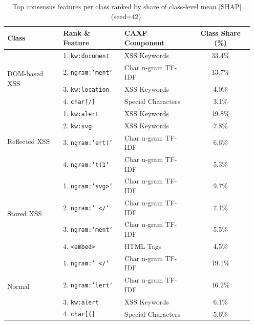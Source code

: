 \documentclass[11pt,a4paper]{article}
\begin{document}
\begin{table}[ht]
\centering
\caption{Top consensus features per class ranked by share of class-level mean $|$SHAP$|$ (seed=42).}
\label{tab:shap_top_class}
\setlength{\tabcolsep}{5pt}
\begin{tabular}{lllc}
\toprule
\textbf{Class} & \textbf{Rank \& Feature} & \textbf{CAXF Component} & \textbf{Class Share (\%)} \\
\midrule
\multirow{4}{*}{DOM-based XSS}
  & 1. \texttt{kw:document}     & XSS Keywords        & 33.4\% \\
  & 2. \texttt{ngram:'ment'}     & Char n-gram TF-IDF  & 13.7\% \\
  & 3. \texttt{kw:location}     & XSS Keywords        &  4.0\% \\
  & 4. \texttt{char[/]}         & Special Characters  &  3.1\% \\
\midrule
\multirow{4}{*}{Reflected XSS}
  & 1. \texttt{kw:alert}        & XSS Keywords        & 19.8\% \\
  & 2. \texttt{kw:svg}          & XSS Keywords        &  7.8\% \\
  & 3. \texttt{ngram:'ert('}    & Char n-gram TF-IDF  &  6.6\% \\
  & 4. \texttt{ngram:'t(1'}     & Char n-gram TF-IDF  &  5.3\% \\
\midrule
\multirow{4}{*}{Stored XSS}
  & 1. \texttt{ngram:'svg>'}    & Char n-gram TF-IDF  &  9.7\% \\
  & 2. \texttt{ngram:' </'}     & Char n-gram TF-IDF  &  7.1\% \\
  & 3. \texttt{ngram:'ment'}    & Char n-gram TF-IDF  &  5.5\% \\
  & 4. \texttt{<embed>}         & HTML Tags           &  4.5\% \\
\midrule
\multirow{4}{*}{Normal}
  & 1. \texttt{ngram:' </'}     & Char n-gram TF-IDF  & 19.1\% \\
  & 2. \texttt{ngram:'lert'}    & Char n-gram TF-IDF  & 16.2\% \\
  & 3. \texttt{kw:alert}        & XSS Keywords        &  6.1\% \\
  & 4. \texttt{char[(]}         & Special Characters  &  5.6\% \\
\bottomrule
\end{tabular}
\end{table}
\end{document}
